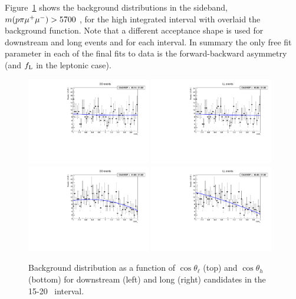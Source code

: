 %
Figure~\ref{fig:cosThetaLbkg} shows the background distributions in the sideband, $m(p\pi\mumu) > 5700$ \mevcc,
for the high \qsq integrated interval with overlaid the background function.
Note that a different acceptance shape is used for downstream and long events and for each \qsq interval.
%
In summary the only free fit parameter in each of the final fits to data is the forward-backward asymmetry
(and $f_{\rm L}$ in the leptonic case). 
%
\begin{figure}[h]
\centering
\includegraphics[width=0.48\textwidth]{Lmumu/figs/AngularBkgFits/BkgFit_highq2_DD.pdf}
\includegraphics[width=0.48\textwidth]{Lmumu/figs/AngularBkgFits/BkgFit_highq2_LL.pdf}
\includegraphics[width=0.48\textwidth]{Lmumu/figs/AngularBkgFits/BkgFitB_highq2_DD.pdf}
\includegraphics[width=0.48\textwidth]{Lmumu/figs/AngularBkgFits/BkgFitB_highq2_LL.pdf}
\caption{Background distribution as a function of $\cos\theta_\ell$ (top) and $\cos\theta_h$ (bottom)
for downstream (left) and long (right) candidates in the 15-20 \gevgevcccc ~\qsq interval.  }
\label{fig:cosThetaLbkg}
\end{figure}

